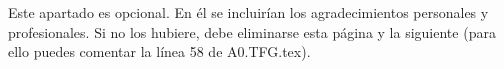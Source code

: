 
\pagestyle{fancy}



Este apartado es opcional. En él se incluirían los agradecimientos personales y profesionales. Si no los hubiere, debe eliminarse esta página y la siguiente (para ello puedes comentar la línea 58 de A0.TFG.tex).

\chapterend


\blankpage

